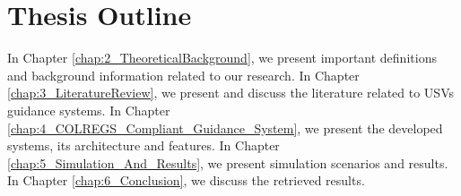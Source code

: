     \section{Thesis Outline}
    
    In Chapter \ref{chap:2_TheoreticalBackground}, we present important definitions and background information related to our research. In Chapter \ref{chap:3_LiteratureReview}, we present and discuss the literature related to \acp{USV} guidance systems. 
    In Chapter \ref{chap:4_COLREGS_Compliant_Guidance_System}, we present the developed systems, its architecture and features. In Chapter \ref{chap:5_Simulation_And_Results}, we present simulation scenarios and results. In Chapter \ref{chap:6_Conclusion}, we discuss the retrieved results.
    